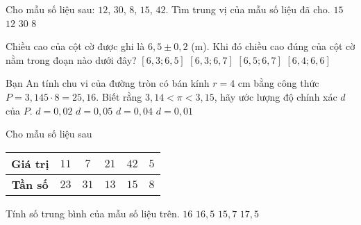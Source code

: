 \begin{ex}%
	Cho mẫu số liệu sau: $12$, $30$, $8$, $15$, $42$. Tìm trung vị của mẫu số liệu đã cho.
	\choice
	{\True$15$}
	{$12$}
	{$30$}
	{$8$}
\end{ex}

\begin{ex}%
	Chiều cao của cột cờ được ghi là $6{,}5\pm0{,}2$ (m). Khi đó chiều cao đúng của cột cờ nằm trong đoạn nào dưới đây?
	\choice
	{$[6{,}3;6{,}5]$}
	{\True $[6{,}3;6{,}7]$}
	{$[6{,}5;6{,}7]$}
	{$[6{,}4;6{,}6]$}
\end{ex}

\begin{ex}%
	Bạn An tính chu vi của đường tròn có bán kính $r=4$ cm bằng công thức $P=3{,}145\cdot8=25{,}16$. Biết rằng $3{,}14<\pi<3{,}15$, hãy ước lượng độ chính xác $d$ của $P$.
	\choice
	{$d=0{,}02$}
	{$d=0{,}05$}
	{\True$d=0{,}04$}
	{$d=0{,}01$}
\end{ex}

\begin{ex}%
	Cho mẫu số liệu sau
	\begin{center}
		\begin{tabular}{|c|c|c|c|c|c|}
			\hline
			\textbf{Giá trị} & $11$ & $7$ & $21$ & $42$ & $5$\\
			\hline
			\textbf{Tần số} & $23$ & $31$ & $13$ & $15$ & $8$\\
			\hline
		\end{tabular}
	\end{center}
	Tính số trung bình của mẫu số liệu trên.
	\choice
	{$16$}
	{$16{,}5$}
	{\True$15{,}7$}
	{$17{,}5$}
\end{ex}

